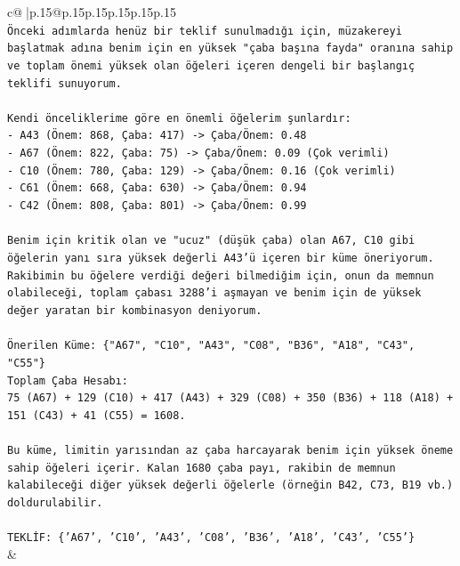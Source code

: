 \documentclass{article}
\begin{document}
{\begin{supertabular}{c@{$\;$}|p{.15\linewidth}@{}p{.15\linewidth}p{.15\linewidth}p{.15\linewidth}p{.15\linewidth}p{.15\linewidth}}
{{{\\ 
\texttt{Önceki adımlarda henüz bir teklif sunulmadığı için, müzakereyi başlatmak adına benim için en yüksek "çaba başına fayda" oranına sahip ve toplam önemi yüksek olan öğeleri içeren dengeli bir başlangıç teklifi sunuyorum.} \\
\\ 
\texttt{Kendi önceliklerime göre en önemli öğelerim şunlardır:} \\
\texttt{{-} A43 (Önem: 868, Çaba: 417) {-}> Çaba/Önem: 0.48} \\
\texttt{{-} A67 (Önem: 822, Çaba: 75) {-}> Çaba/Önem: 0.09 (Çok verimli)} \\
\texttt{{-} C10 (Önem: 780, Çaba: 129) {-}> Çaba/Önem: 0.16 (Çok verimli)} \\
\texttt{{-} C61 (Önem: 668, Çaba: 630) {-}> Çaba/Önem: 0.94} \\
\texttt{{-} C42 (Önem: 808, Çaba: 801) {-}> Çaba/Önem: 0.99} \\
\\ 
\texttt{Benim için kritik olan ve "ucuz" (düşük çaba) olan A67, C10 gibi öğelerin yanı sıra yüksek değerli A43'ü içeren bir küme öneriyorum. Rakibimin bu öğelere verdiği değeri bilmediğim için, onun da memnun olabileceği, toplam çabası 3288'i aşmayan ve benim için de yüksek değer yaratan bir kombinasyon deniyorum.} \\
\\ 
\texttt{Önerilen Küme: \{"A67", "C10", "A43", "C08", "B36", "A18", "C43", "C55"\}} \\
\texttt{Toplam Çaba Hesabı:} \\
\texttt{75 (A67) + 129 (C10) + 417 (A43) + 329 (C08) + 350 (B36) + 118 (A18) + 151 (C43) + 41 (C55) = 1608.} \\
\\ 
\texttt{Bu küme, limitin yarısından az çaba harcayarak benim için yüksek öneme sahip öğeleri içerir. Kalan 1680 çaba payı, rakibin de memnun kalabileceği diğer yüksek değerli öğelerle (örneğin B42, C73, B19 vb.) doldurulabilir.} \\
\\ 
\texttt{TEKLİF: \{'A67', 'C10', 'A43', 'C08', 'B36', 'A18', 'C43', 'C55'\}} \\
            }
        }
    }
    & \\ \\


\end{supertabular}}
\end{document}

